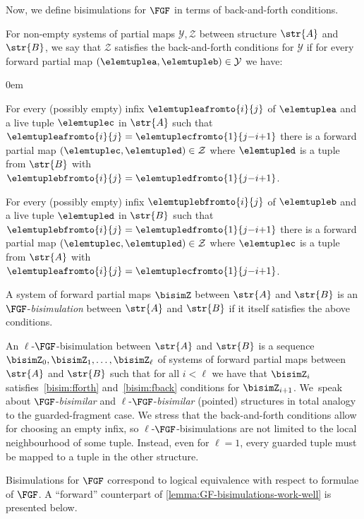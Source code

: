 Now, we define bisimulations for $\FGF$ in terms of back-and-forth conditions.
\begin{definition}
  For non-empty systems of partial maps $\mathcal{Y}, \mathcal{Z}$ between structure $\str{A}$ and $\str{B}$, we say that $\mathcal{Z}$ satisfies the back-and-forth conditions for $\mathcal{Y}$ if for every forward partial map $(\elemtuplea, \elemtupleb) \in \mathcal{Y}$ we have:
  \begin{description}\itemsep0em
    \item[\desclabel{(fForth)}{bisim:fforth}] For every (possibly empty) infix $\elemtupleafromto{i}{j}$ of $\elemtuplea$ and a live tuple $\elemtuplec$ in $\str{A}$ such that $\elemtupleafromto{i}{j} = \elemtuplecfromto{1}{j{-}i{+}1}$ there is a forward partial map $(\elemtuplec, \elemtupled) \in \mathcal{Z}$ where $\elemtupled$ is a tuple from $\str{B}$ with $\elemtuplebfromto{i}{j} = \elemtupledfromto{1}{j{-}i{+}1}$.
    \item[\desclabel{(fBack)}{bisim:fback}] For every (possibly empty) infix $\elemtuplebfromto{i}{j}$ of $\elemtupleb$ and a live tuple $\elemtupled$ in $\str{B}$ such that $\elemtuplebfromto{i}{j} = \elemtupledfromto{1}{j{-}i{+}1}$ there is a forward partial map $(\elemtuplec, \elemtupled) \in \mathcal{Z}$ where $\elemtuplec$ is a tuple from $\str{A}$ with $\elemtupleafromto{i}{j} = \elemtuplecfromto{1}{j{-}i{+}1}$.
  \end{description}
  A system of forward partial maps $\bisimZ$ between $\str{A}$ and $\str{B}$ is an $\FGF$-\emph{bisimulation} between $\str{A}$ and $\str{B}$ if it itself satisfies the above conditions.
\end{definition}
An $\ell$-$\FGF$-bisimulation between $\str{A}$ and $\str{B}$ is a sequence $\bisimZ_0, \bisimZ_1, \ldots, \bisimZ_\ell$ of systems of forward partial maps between $\str{A}$ and $\str{B}$ such that for all $i < \ell$ we have that $\bisimZ_i$ satisfies~\ref{bisim:fforth} and~\ref{bisim:fback} conditions for $\bisimZ_{i{+}1}$.
We~speak about $\FGF$-\emph{bisimilar} and $\ell$-$\FGF$-\emph{bisimilar} (pointed) structures in total analogy to the guarded-fragment case.
We stress that the back-and-forth conditions allow for choosing an empty infix, so $\ell$-$\FGF$-bisimulations are not limited to the local neighbourhood of some tuple.
Instead, even for $\ell = 1$, every guarded tuple must be mapped to a tuple in the other structure.

Bisimulations for $\FGF$ correspond to logical equivalence with respect to formulae of $\FGF$.
A ``forward'' counterpart of \cref{lemma:GF-bisimulations-work-well} is presented below.


